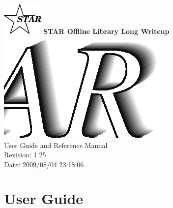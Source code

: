 \documentclass[twoside]{article}
\begin{document}
%
%
\begin{titlepage}
\pagestyle{empty}
\vspace*{-35mm}
\begin{center}
  \mbox{\includegraphics[width=2cm]{StarIcon.eps}}
  {\Large\bf STAR Offline Library Long Writeup}
  \hfill\mbox{}\\[3cm]
  \mbox{\includegraphics[width=\textwidth]{StarClassLibraryTitle.eps}}
  \hfill\mbox{}\\[3cm]
  {\LARGE User Guide and Reference Manual}\\[2cm]
  {\LARGE $ $Revision: 1.25 $ $}  \\[5mm] %
  {\LARGE $ $Date: 2009/08/04 23:18:06 $ $}  %
  \vfill
\end{center}
\cleardoublepage
\end{titlepage}

%
%
\tableofcontents
\cleardoublepage

%
%
\part{User Guide}
\clearpage
\end{document}
